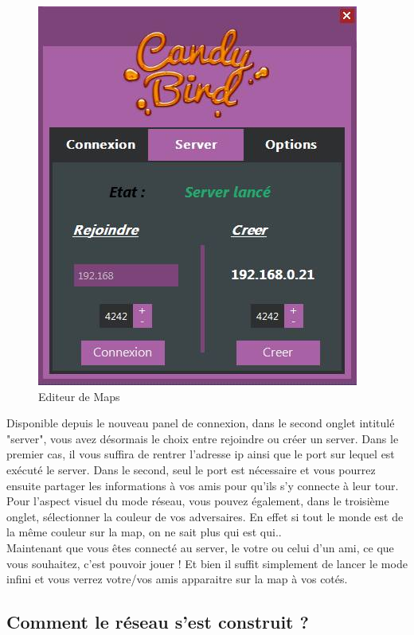 \documentclass [11pt]{report}
\begin{document}
		\vspace{6mm}
		
		\begin{figure}[h]
			\centering
			\includegraphics[width=0.6\linewidth]{images/panel.jpg}
			\caption[Editeur de Maps]{Editeur de Maps}
			\label{fig:Editeur}
		\end{figure}
		
		\vspace{6mm}
				
		Disponible depuis le nouveau panel de connexion, dans le second onglet intitulé "server", vous avez désormais le choix entre rejoindre ou créer un server. Dans le premier cas, il vous suffira de rentrer l'adresse ip ainsi que le port sur lequel est exécuté le server. Dans le second, seul le port est nécessaire et vous pourrez ensuite partager les informations à vos amis pour qu'ils s'y connecte à leur tour. Pour l'aspect visuel du mode réseau, vous pouvez également, dans le troisième onglet, sélectionner la couleur de vos adversaires. En effet si tout le monde est de la même couleur sur la map, on ne sait plus qui est qui..\\		
		
		Maintenant que vous êtes connecté au server, le votre ou celui d'un ami, ce que vous souhaitez,  c'est pouvoir jouer ! Et bien il suffit simplement de lancer le mode infini et vous verrez votre/vos amis apparaitre sur la map à vos cotés.\\		
			
			
				
		\newpage
		
		
		\subsection{Comment le réseau s'est construit ?}
		\vspace{6mm}
		
\end{document}
